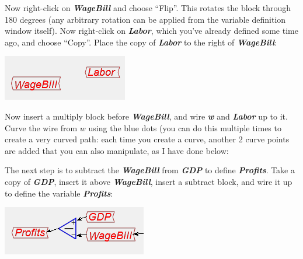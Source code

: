 Now right-click on \textbf{\em WageBill} and choose ``Flip''. This
rotates the block through 180 degrees (any arbitrary rotation can
be applied from the variable definition window itself). Now right-click
on \textbf{\em Labor}, which you've already defined some time ago,
and choose ``Copy''. Place the copy of \textbf{\em Labor} to the
right of \textbf{\em WageBill}:
\begin{center}
\includegraphics{images/NewItem98} 
\par\end{center}

Now insert a multiply block before \textbf{\em WageBill}, and wire
\textbf{\em w} and \textbf{\em Labor} up to it. Curve the wire from
$w$ using the blue dots (you can do this multiple times to create
a very curved path: each time you create a curve, another 2 curve
points are added that you can also manipulate, as I have done below:
\begin{center}
\par\end{center}

The next step is to subtract the \textbf{\em WageBill} from \textbf{\em
GDP} to define \textbf{\em Profits}. Take a copy of \textbf{\em
GDP}, insert it above \textbf{\em WageBill}, insert a subtract block,
and wire it up to define the variable \textbf{\em Profits}:
\begin{center}
\includegraphics{images/NewItem100} 
\par\end{center}

